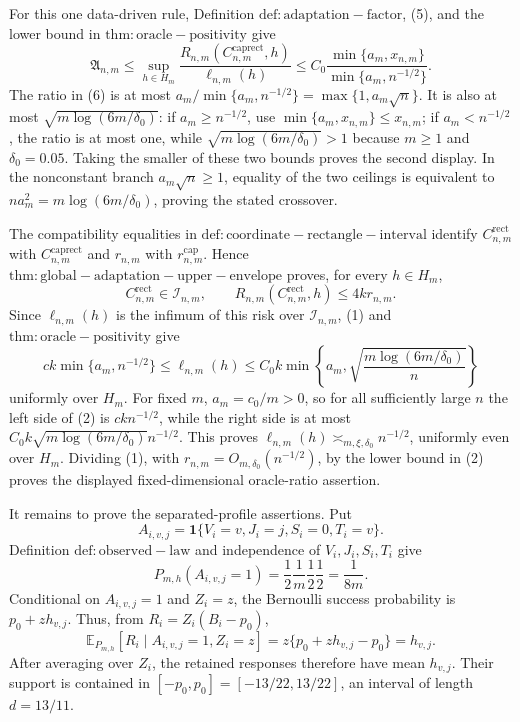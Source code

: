 For this one data-driven rule, Definition \(\mathrm{def:adaptation-factor}\), (5), and the lower bound in \(\mathrm{thm:oracle-positivity}\) give
\[
 \mathfrak A_{n,m}
 \leq\sup_{h\in H_m}\frac{R_{n,m}(C^{\mathrm{caprect}}_{n,m},h)}{\ell_{n,m}(h)}
 \leq C_0\frac{\min\{a_m,x_{n,m}\}}{\min\{a_m,n^{-1/2}\}}.          \tag{6}
\]
The ratio in (6) is at most \(a_m/\min\{a_m,n^{-1/2}\}=\max\{1,a_m\sqrt n\}\). It is also at most \(\sqrt{m\log(6m/\delta_0)}\): if \(a_m\geq n^{-1/2}\), use \(\min\{a_m,x_{n,m}\}\leq x_{n,m}\); if \(a_m<n^{-1/2}\), the ratio is at most one, while \(\sqrt{m\log(6m/\delta_0)}>1\) because \(m\geq1\) and \(\delta_0=0.05\). Taking the smaller of these two bounds proves the second display. In the nonconstant branch \(a_m\sqrt n\geq1\), equality of the two ceilings is equivalent to \(na_m^2=m\log(6m/\delta_0)\), proving the stated crossover.

The compatibility equalities in \(\mathrm{def:coordinate-rectangle-interval}\) identify \(C^{\mathrm{rect}}_{n,m}\) with \(C^{\mathrm{caprect}}_{n,m}\) and \(r_{n,m}\) with \(r^{\mathrm{cap}}_{n,m}\). Hence \(\mathrm{thm:global-adaptation-upper-envelope}\) proves, for every \(h\in H_m\),
\[
 C^{\mathrm{rect}}_{n,m}\in\mathcal I_{n,m},
 \qquad
 R_{n,m}(C^{\mathrm{rect}}_{n,m},h)\leq4kr_{n,m}.                       \tag{1}
\]
Since \(\ell_{n,m}(h)\) is the infimum of this risk over \(\mathcal I_{n,m}\), (1) and \(\mathrm{thm:oracle-positivity}\) give
\[
 ck\min\{a_m,n^{-1/2}\}
 \leq\ell_{n,m}(h)
 \leq C_0k\min\left\{a_m,\sqrt{\frac{m\log(6m/\delta_0)}{n}}\right\} \tag{2}
\]
uniformly over \(H_m\). For fixed \(m\), \(a_m=c_0/m>0\), so for all sufficiently large \(n\) the left side of (2) is \(ckn^{-1/2}\), while the right side is at most \(C_0k\sqrt{m\log(6m/\delta_0)}n^{-1/2}\). This proves \(\ell_{n,m}(h)\asymp_{m,\xi,\delta_0}n^{-1/2}\), uniformly even over \(H_m\). Dividing (1), with \(r_{n,m}=O_{m,\delta_0}(n^{-1/2})\), by the lower bound in (2) proves the displayed fixed-dimensional oracle-ratio assertion.

It remains to prove the separated-profile assertions. Put
\[
 A_{i,v,j}=\mathbf1\{V_i=v,J_i=j,S_i=0,T_i=v\}.
\]
Definition \(\mathrm{def:observed-law}\) and independence of \(V_i,J_i,S_i,T_i\) give
\[
 P_{m,h}(A_{i,v,j}=1)=\frac12\frac1m\frac12\frac12=\frac1{8m}.          \tag{3}
\]
Conditional on \(A_{i,v,j}=1\) and \(Z_i=z\), the Bernoulli success probability is \(p_0+zh_{v,j}\). Thus, from \(R_i=Z_i(B_i-p_0)\),
\[
 \mathbb E_{P_{m,h}}[R_i\mid A_{i,v,j}=1,Z_i=z]
 =z\{p_0+zh_{v,j}-p_0\}=h_{v,j}.                                      \tag{4}
\]
After averaging over \(Z_i\), the retained responses therefore have mean \(h_{v,j}\). Their support is contained in \([-p_0,p_0]=[-13/22,13/22]\), an interval of length \(d=13/11\).

